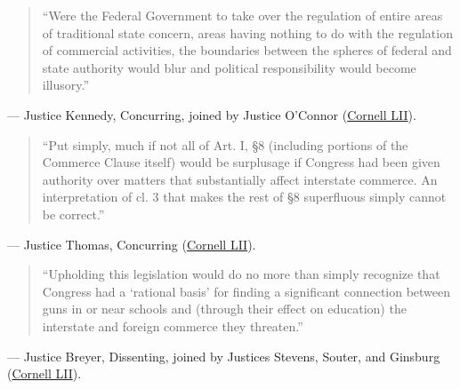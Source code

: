\documentclass[12pt]{article}
\begin{document}
\begin{quote}
``Were the Federal Government to take over the regulation of entire areas of traditional state concern, areas having nothing to do with the regulation of commercial activities, the boundaries between the spheres of federal and state authority would blur and political responsibility would become illusory.''
\end{quote}
\noindent --- Justice Kennedy, Concurring, joined by Justice O'Connor (\href{https://www.law.cornell.edu/supct/html/93-1260.ZC.html}{Cornell LII}).

\begin{quote}
``Put simply, much if not all of Art. I, \S 8 (including portions of the Commerce Clause itself) would be surplusage if Congress had been given authority over matters that substantially affect interstate commerce. An interpretation of cl. 3 that makes the rest of \S 8 superfluous simply cannot be correct.''
\end{quote}
\noindent --- Justice Thomas, Concurring (\href{https://www.law.cornell.edu/supct/html/93-1260.ZC1.html}{Cornell LII}).

\begin{quote}
``Upholding this legislation would do no more than simply recognize that Congress had a `rational basis' for finding a significant connection between guns in or near schools and (through their effect on education) the interstate and foreign commerce they threaten.''
\end{quote}
\noindent --- Justice Breyer, Dissenting, joined by Justices Stevens, Souter, and Ginsburg (\href{https://www.law.cornell.edu/supct/html/93-1260.ZD2.html}{Cornell LII}).
\end{document}
